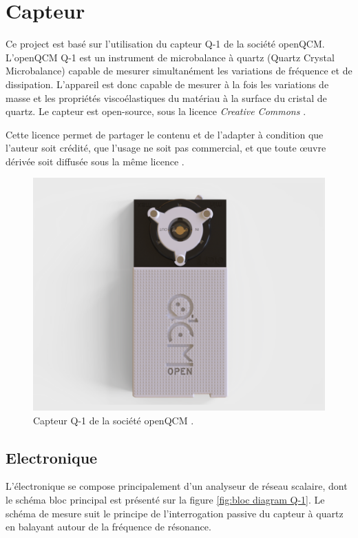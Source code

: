 \chapter{Capteur}

Ce project est basé sur l'utilisation du capteur Q-1 de la société openQCM.
L’openQCM Q-1 est un instrument de microbalance à quartz (Quartz Crystal Microbalance) capable de mesurer simultanément les variations de fréquence et de dissipation. 
L’appareil est donc capable de mesurer à la fois les variations de masse et les propriétés viscoélastiques du matériau à la surface du cristal de quartz.
Le capteur est open-source, sous la licence \textit{Creative Commons} \cite{manual-openqcmQ1}.

Cette licence permet de partager le contenu et de l’adapter à condition que l’auteur soit crédité, que l’usage ne soit pas commercial, 
et que toute œuvre dérivée soit diffusée sous la même licence \cite{cc-by-nc-sa-4.0}.

\begin{figure}[H]
    \centering
    \includegraphics[width=\textwidth]{assets/figures/Quartz-Crystal-Microbalance-QCM-D-openQCM-Q-1.png}
    \caption{Capteur Q-1 de la société openQCM \cite{manual-openqcmQ1}.}
    \label{fig:Q-1}
\end{figure}

\section{Electronique}
L’électronique se compose principalement d’un analyseur de réseau scalaire, dont le schéma bloc principal est présenté sur la figure \ref{fig:bloc diagram Q-1}. Le schéma de mesure suit le principe de l’interrogation passive du capteur à quartz en balayant autour de la fréquence de résonance.

